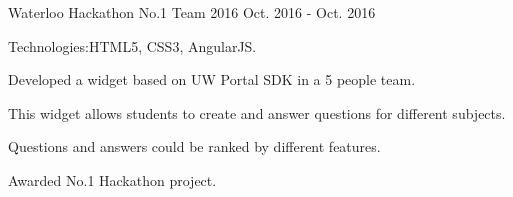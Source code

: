 \begin{cventries}  
    \cventry
    {}
    {Waterloo Hackathon No.1 Team 2016}
    {}
    {Oct. 2016 - Oct. 2016}
    {
      \begin{cvitems}
        \item {Technologies:\quad HTML5, CSS3, AngularJS.}
        \item {Developed a widget based on UW Portal SDK in a 5 people team.}
        \item {This widget allows students to create and answer questions for different subjects.}
        \item {Questions and answers could be ranked by different features.}
        \item {Awarded No.1 Hackathon project.}
      \end{cvitems}
    }
    
\end{cventries}
